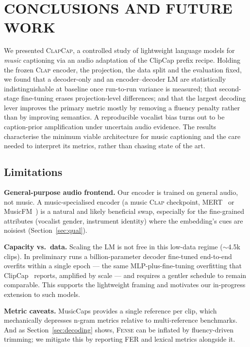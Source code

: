 \documentclass[9pt]{report}
\newcommand{\fense}{\textsc{Fense}}
\newcommand{\clapenc}{\textsc{Clap}}
\newcommand{\sys}{\textsc{ClapCap}}
\begin{document}


\FloatBarrier
\chapter{CONCLUSIONS AND FUTURE WORK}\label{ch:conclusion}

We presented \sys{}, a controlled study of lightweight language models for \emph{music}
captioning via an audio adaptation of the ClipCap prefix recipe. Holding the frozen \clapenc{}
encoder, the projection, the data split and the evaluation fixed, we found that a decoder-only
and an encoder--decoder LM are statistically indistinguishable at baseline once run-to-run
variance is measured; that second-stage fine-tuning erases projection-level differences; and
that the largest decoding lever improves the primary metric mostly by removing a fluency penalty
rather than by improving semantics. A reproducible vocalist bias turns out to be
caption-prior amplification under uncertain audio evidence. The results characterise the minimum
viable architecture for music captioning and the care needed to interpret its metrics, rather
than chasing state of the art.

\section{Limitations}

\textbf{General-purpose audio frontend.} Our encoder is trained on general audio, not music. A
music-specialised encoder (a music \clapenc{} checkpoint, MERT~\cite{li2024mert} or
MusicFM~\cite{won2024musicfm}) is a natural and likely beneficial swap, especially for the
fine-grained attributes (vocalist gender, instrument identity) where the embedding's cues are
noisiest (Section~\ref{sec:qual}).

\textbf{Capacity vs.\ data.} Scaling the LM is not free in this low-data regime
($\sim$4.5k clips). In preliminary runs a billion-parameter decoder fine-tuned end-to-end
overfits within a single epoch --- the same MLP-plus-fine-tuning overfitting that
ClipCap~\cite{mokady2021clipcap} reports, amplified by scale --- and requires a gentler schedule
to remain comparable. This supports the lightweight framing and motivates our in-progress
extension to such models.

\textbf{Metric caveats.} MusicCaps provides a single reference per clip, which mechanically
depresses n-gram metrics relative to multi-reference benchmarks. And as
Section~\ref{sec:decoding} shows, \fense{} can be inflated by fluency-driven trimming; we
mitigate this by reporting FER and lexical metrics alongside it.
\end{document}
